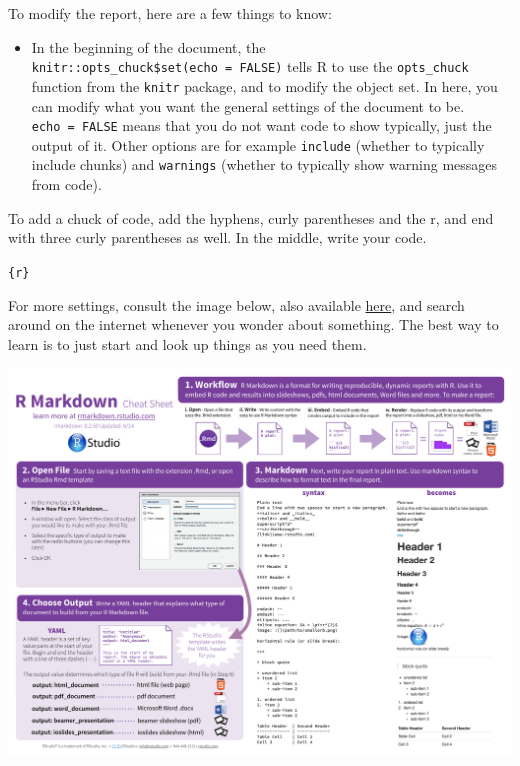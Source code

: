 \documentclass[
]{article}
\providecommand{\tightlist}{%
  \setlength{\itemsep}{0pt}\setlength{\parskip}{0pt}}
\begin{document}
To modify the report, here are a few things to know:

\begin{itemize}
\tightlist
\item
  In the beginning of the document, the
  \texttt{knitr::opts\_chuck\$set(echo\ =\ FALSE)} tells R to use the
  \texttt{opts\_chuck} function from the \texttt{knitr} package, and to
  modify the object set. In here, you can modify what you want the
  general settings of the document to be. \texttt{echo\ =\ FALSE} means
  that you do not want code to show typically, just the output of it.
  Other options are for example \texttt{include} (whether to typically
  include chunks) and \texttt{warnings} (whether to typically show
  warning messages from code).
\end{itemize}

To add a chuck of code, add the hyphens, curly parentheses and the r,
and end with three curly parentheses as well. In the middle, write your
code.

\texttt{\textasciigrave{}\textasciigrave{}\textasciigrave{}\{r\}}

\texttt{\textasciigrave{}\textasciigrave{}\textasciigrave{}}

For more settings, consult the image below, also available
\href{https://www.rstudio.com/wp-content/uploads/2015/02/rmarkdown-cheatsheet.pdf}{here},
and search around on the internet whenever you wonder about something.
The best way to learn is to just start and look up things as you need
them.

\includegraphics[width=1\textwidth,height=\textheight]{./figures/rmarkdown-cheatsheet.pdf}
\end{document}

